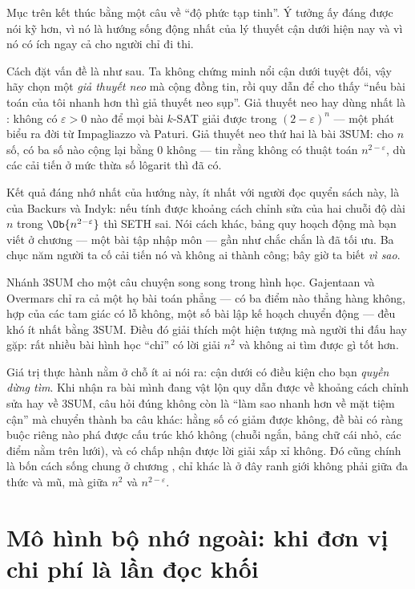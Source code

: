 \documentclass[../../algorithm.tex]{subfiles}
\begin{document}
Mục trên kết thúc bằng một câu về ``độ phức tạp tinh''. Ý tưởng ấy đáng được nói kỹ hơn, vì nó là hướng sống động nhất của lý thuyết cận dưới hiện nay và vì nó có ích ngay cả cho người chỉ đi thi.

Cách đặt vấn đề là như sau. Ta không chứng minh nổi cận dưới tuyệt đối, vậy hãy chọn một \emph{giả thuyết neo} mà cộng đồng tin, rồi quy dẫn để cho thấy ``nếu bài toán của tôi nhanh hơn thì giả thuyết neo sụp''. Giả thuyết neo hay dùng nhất là : không có \(\varepsilon>0\) nào để mọi bài \(k\)-SAT giải được trong \((2-\varepsilon)^n\) --- một phát biểu ra đời từ Impagliazzo và Paturi\cite{impagliazzo2001}. Giả thuyết neo thứ hai là bài 3SUM: cho \(n\) số, có ba số nào cộng lại bằng 0 không --- tin rằng không có thuật toán \(n^{2-\varepsilon}\), dù các cải tiến ở mức thừa số lôgarit thì đã có.

Kết quả đáng nhớ nhất của hướng này, ít nhất với người đọc quyển sách này, là của Backurs và Indyk\cite{backurs2018}: nếu tính được khoảng cách chỉnh sửa của hai chuỗi độ dài \(n\) trong \(\Ob{n^{2-\varepsilon}}\) thì SETH sai. Nói cách khác, bảng quy hoạch động  mà bạn viết ở chương  --- một bài tập nhập môn --- gần như chắc chắn là đã tối ưu. Ba chục năm người ta cố cải tiến nó và không ai thành công; bây giờ ta biết \emph{vì sao}.

Nhánh 3SUM cho một câu chuyện song song trong hình học. Gajentaan và Overmars\cite{gajentaan1995} chỉ ra cả một họ bài toán phẳng --- có ba điểm nào thẳng hàng không, hợp của các tam giác có lỗ không, một số bài lập kế hoạch chuyển động --- đều khó ít nhất bằng 3SUM. Điều đó giải thích một hiện tượng mà người thi đấu hay gặp: rất nhiều bài hình học ``chỉ'' có lời giải \(n^2\) và không ai tìm được gì tốt hơn.

Giá trị thực hành nằm ở chỗ ít ai nói ra: cận dưới có điều kiện cho bạn \emph{quyền dừng tìm}. Khi nhận ra bài mình đang vật lộn quy dẫn được về khoảng cách chỉnh sửa hay về 3SUM, câu hỏi đúng không còn là ``làm sao nhanh hơn về mặt tiệm cận'' mà chuyển thành ba câu khác: hằng số có giảm được không, đề bài có ràng buộc riêng nào phá được cấu trúc khó không (chuỗi ngắn, bảng chữ cái nhỏ, các điểm nằm trên lưới), và có chấp nhận được lời giải xấp xỉ không. Đó cũng chính là bốn cách sống chung ở chương , chỉ khác là ở đây ranh giới không phải giữa đa thức và mũ, mà giữa \(n^2\) và \(n^{2-\varepsilon}\).

\section{Mô hình bộ nhớ ngoài: khi đơn vị chi phí là lần đọc khối}
\end{document}
